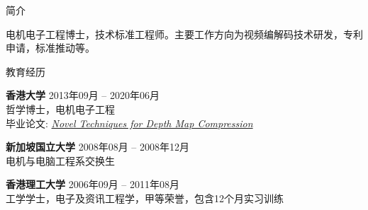 \documentclass{resume} %
\begin{document}

\begin{rSection}{简介}

电机电子工程博士，技术标准工程师。主要工作方向为视频编解码技术研发，专利申请，标准推动等。

\end{rSection}


\begin{rSection}{教育经历}

{\bf 香港大学} \hfill {2013年09月 -- 2020年06月} \\ 
哲学博士，电机电子工程 \\
毕业论文: \href{http://hdl.handle.net/10722/318421}{\textit{Novel Techniques for Depth Map Compression}}

{\bf 新加坡国立大学} \hfill {2008年08月 -- 2008年12月} \\ 
电机与电脑工程系交换生

{\bf 香港理工大学} \hfill {2006年09月 -- 2011年08月} \\ 
工学学士，电子及资讯工程学，甲等荣誉，包含12个月实习训练

\end{rSection}

\end{document}
